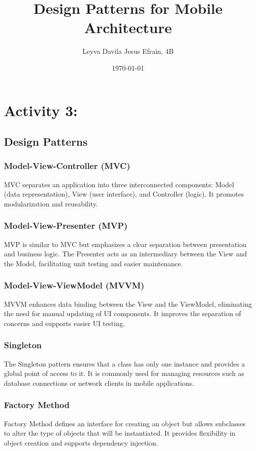 \documentclass{article}
\title{Design Patterns for Mobile Architecture}
\author{Leyva Davila Jesus Efrain, 4B}
\date{\today}
\begin{document}
\maketitle

\section{Activity 3:}

\subsection{Design Patterns}

\subsubsection{Model-View-Controller (MVC)}
MVC separates an application into three interconnected components: Model (data representation), View (user interface), and Controller (logic). It promotes modularization and reusability.

\subsubsection{Model-View-Presenter (MVP)}
MVP is similar to MVC but emphasizes a clear separation between presentation and business logic. The Presenter acts as an intermediary between the View and the Model, facilitating unit testing and easier maintenance.

\subsubsection{Model-View-ViewModel (MVVM)}
MVVM enhances data binding between the View and the ViewModel, eliminating the need for manual updating of UI components. It improves the separation of concerns and supports easier UI testing.

\subsubsection{Singleton}
The Singleton pattern ensures that a class has only one instance and provides a global point of access to it. It is commonly used for managing resources such as database connections or network clients in mobile applications.

\subsubsection{Factory Method}
Factory Method defines an interface for creating an object but allows subclasses to alter the type of objects that will be instantiated. It provides flexibility in object creation and supports dependency injection.
\end{document}
